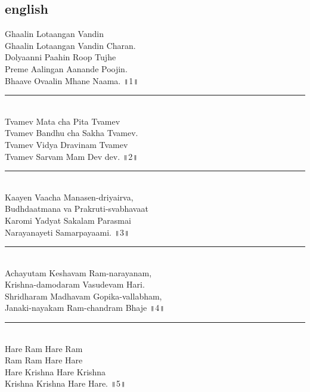 \documentclass[letterpaper,twocolumn,openany,nodeprecatedcode]{dndbook}
\begin{document}
\begin{flushleft}
  \section*{english}
  Ghaalin Lotaangan Vandin \\
  Ghaalin Lotaangan Vandin Charan. \\
  Dolyaanni Paahin Roop Tujhe \\
  Preme Aalingan Aanande Poojin. \\
  Bhaave Ovaalin Mhane Naama. ॥1॥\\
  \rule{\linewidth}{1pt} \\
  Tvamev Mata cha Pita Tvamev \\
  Tvamev Bandhu cha Sakha Tvamev. \\
  Tvamev Vidya Dravinam Tvamev \\
  Tvamev Sarvam Mam Dev dev. ॥2॥\\
  \rule{\linewidth}{1pt} \\
  Kaayen Vaacha Manasen-driyairva, \\
  Budhdaatmana va Prakruti-svabhavaat \\
  Karomi Yadyat Sakalam Parasmai \\
  Narayanayeti Samarpayaami. ॥3॥\\
  \rule{\linewidth}{1pt} \\
  Achayutam Keshavam Ram-narayanam, \\
  Krishna-damodaram Vasudevam Hari. \\
  Shridharam Madhavam Gopika-vallabham, \\
  Janaki-nayakam Ram-chandram Bhaje ॥4॥ \\
  \rule{\linewidth}{1pt} \\
  Hare Ram Hare Ram \\
  Ram Ram Hare Hare \\
  Hare Krishna Hare Krishna \\
  Krishna Krishna Hare Hare. ॥5॥\\
  \pagebreak

\end{flushleft}
\end{document}
